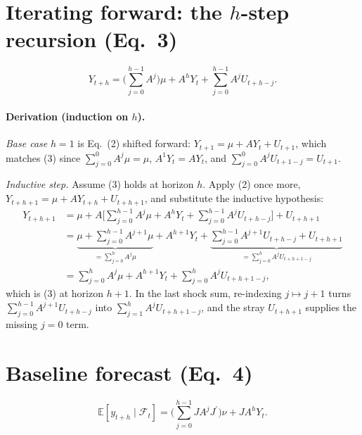\documentclass[11pt]{article}
\newcommand{\E}{\mathbb{E}}
\newcommand{\Fset}{\mathcal{F}}
\newcommand{\tp}{^{\prime}}
\theoremstyle{remark}
\begin{document}
\section{Iterating forward: the $h$-step recursion (Eq.~3)}
\begin{equation}
Y_{t+h}=\Bigg(\sum_{j=0}^{h-1}A^{j}\Bigg)\mu + A^{h}Y_t
+ \sum_{j=0}^{h-1}A^{j}U_{t+h-j}. \tag{3}
\end{equation}

\paragraph{Derivation (induction on $h$).}
\emph{Base case} $h=1$ is Eq.~(2) shifted forward:
$Y_{t+1}=\mu+AY_t+U_{t+1}$, which matches (3) since
$\sum_{j=0}^{0}A^{j}\mu=\mu$, $A^{1}Y_t=AY_t$, and
$\sum_{j=0}^{0}A^{j}U_{t+1-j}=U_{t+1}$.

\emph{Inductive step.} Assume (3) holds at horizon $h$. Apply (2) once more,
$Y_{t+h+1}=\mu+AY_{t+h}+U_{t+h+1}$, and substitute the inductive hypothesis:
\begin{align*}
Y_{t+h+1}
&=\mu+A\Bigg[\sum_{j=0}^{h-1}A^{j}\mu+A^{h}Y_t+\sum_{j=0}^{h-1}A^{j}U_{t+h-j}\Bigg]
+U_{t+h+1}\\[2pt]
&=\underbrace{\mu+\sum_{j=0}^{h-1}A^{j+1}\mu}_{=\sum_{j=0}^{h}A^{j}\mu}
+A^{h+1}Y_t
+\underbrace{\sum_{j=0}^{h-1}A^{j+1}U_{t+h-j}+U_{t+h+1}}_{=\sum_{j=0}^{h}A^{j}U_{t+h+1-j}}\\[2pt]
&=\sum_{j=0}^{h}A^{j}\mu+A^{h+1}Y_t+\sum_{j=0}^{h}A^{j}U_{t+h+1-j},
\end{align*}
which is (3) at horizon $h+1$. In the last shock sum, re-indexing
$j\mapsto j+1$ turns $\sum_{j=0}^{h-1}A^{j+1}U_{t+h-j}$ into
$\sum_{j=1}^{h}A^{j}U_{t+h+1-j}$, and the stray $U_{t+h+1}$ supplies the missing
$j=0$ term. 

\section{Baseline forecast (Eq.~4)}
\begin{equation}
\E\!\left[y_{t+h}\mid\Fset_t\right]
=\Bigg(\sum_{j=0}^{h-1}JA^{j}J\tp\Bigg)\nu + JA^{h}Y_t. \tag{4}
\end{equation}
\end{document}
